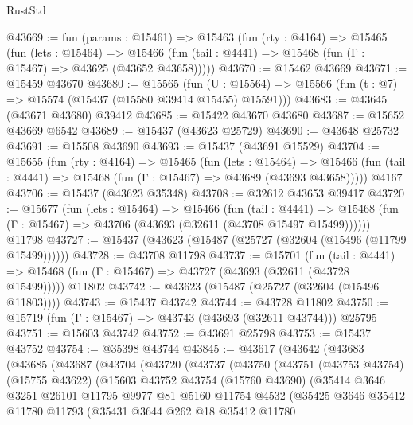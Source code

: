 \begin{lexlean}{RustStd}
\begin{coremodule}
@43669 := fun (params : @15461) =>
  @15463
    (fun (rty : @4164) =>
    @15465
      (fun (lets : @15464) =>
      @15466 (fun (tail : @4441) => @15468 (fun (Γ : @15467) => @43625 (@43652 @43658)))))
@43670 := @15462 @43669
@43671 := @15459 @43670
@43680 := @15565
    (fun (U : @15564) => @15566 (fun (t : @7) => @15574 (@15437 (@15580 @39414 @15455) @15591)))
@43683 := @43645 (@43671 @43680) @39412
@43685 := @15422 @43670 @43680
@43687 := @15652 @43669 @6542
@43689 := @15437 (@43623 @25729)
@43690 := @43648 @25732
@43691 := @15508 @43690
@43693 := @15437 (@43691 @15529)
@43704 := @15655
    (fun (rty : @4164) =>
    @15465
      (fun (lets : @15464) =>
      @15466 (fun (tail : @4441) => @15468 (fun (Γ : @15467) => @43689 (@43693 @43658)))))
    @4167
@43706 := @15437 (@43623 @35348)
@43708 := @32612 @43653 @39417
@43720 := @15677
    (fun (lets : @15464) =>
    @15466
      (fun (tail : @4441) =>
      @15468 (fun (Γ : @15467) => @43706 (@43693 (@32611 (@43708 @15497 @15499))))))
    @11798
@43727 := @15437 (@43623 (@15487 (@25727 (@32604 (@15496 (@11799 @15499))))))
@43728 := @43708 @11798
@43737 := @15701
    (fun (tail : @4441) => @15468 (fun (Γ : @15467) => @43727 (@43693 (@32611 (@43728 @15499)))))
    @11802
@43742 := @43623 (@15487 (@25727 (@32604 (@15496 @11803))))
@43743 := @15437 @43742
@43744 := @43728 @11802
@43750 := @15719 (fun (Γ : @15467) => @43743 (@43693 (@32611 @43744))) @25795
@43751 := @15603 @43742
@43752 := @43691 @25798
@43753 := @15437 @43752
@43754 := @35398 @43744
@43845 := @43617
    (@43642
      (@43683
        (@43685
          (@43687
            (@43704
              (@43720
                (@43737
                  (@43750
                    (@43751
                      (@43753 @43754)
                      (@15755 @43622)
                      (@15603
                        @43752
                        @43754
                        (@15760 @43690)
                        (@35414
                          @3646
                          @3251
                          @26101
                          @11795
                          @9977
                          @81
                          @5160
                          @11754
                          @4532
                          (@35425
                            @3646
                            @35412
                            @11780
                            @11793
                            (@35431
                              @3644
                              @262
                              @18
                              @35412
                              @11780

\end{coremodule}
\end{lexlean}
